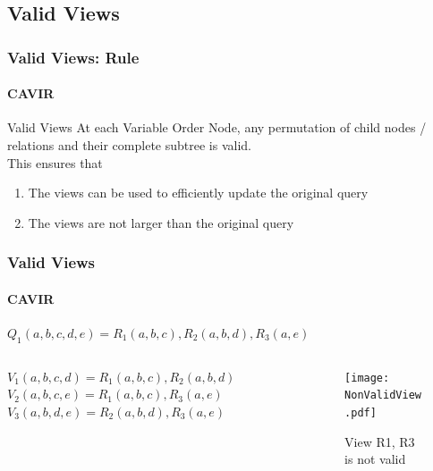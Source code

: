 \documentclass[
	11pt, %
]{beamer}
\begin{document}
\subsection{Valid Views}
\begin{frame}
	\frametitle{Valid Views: Rule}
	\framesubtitle{CAVIR}
	\begin{block}{Valid Views}
		At each Variable Order Node, any permutation of child nodes / relations and their complete subtree is valid.\\
		This ensures that
		\begin{enumerate}
			\item The views can be used to efficiently update the original query
			\item The views are not larger than the original query
		\end{enumerate}
	\end{block}
\end{frame}
\begin{frame}
	\frametitle{Valid Views}
	\framesubtitle{CAVIR}
	$Q_1(a, b, c, d, e) = R_1(a, b, c), R_2(a, b, d), R_3(a, e)$
\begin{columns}[c] 
	\begin{column}{0.5\textwidth} 
		$V_1(a, b, c, d) = R_1(a, b, c), R_2(a, b, d)$ \\
		$V_2(a, b, c, e) = R_1(a,b, c), R_3(a, e)$
		$V_3(a, b ,d ,e) = R_2(a, b ,d), R_3(a, e)$
	\end{column}
	\begin{column}{0.45\textwidth} 
		\begin{figure}
			\texttt{[image: NonValidView.pdf]}
			\caption{View R1, R3 is not valid}
		\end{figure}
	\end{column}
\end{columns}
\end{frame}
\end{document}
